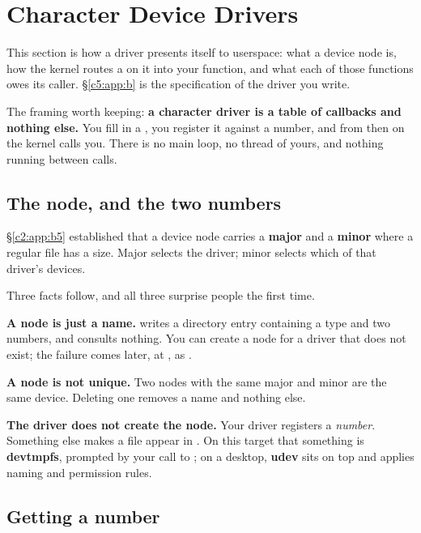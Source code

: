 
\section{Character Device Drivers}
\label{c5:app:a}

This section is how a driver presents itself to userspace: what a device node is, how the kernel
routes a  on it into your function, and what each of those functions owes its caller.
\S\ref{c5:app:b} is the specification of the driver you write.

The framing worth keeping: \textbf{a character driver is a table of callbacks and nothing else.} You
fill in a , you register it against a number, and from then on the
kernel calls you. There is no main loop, no thread of yours, and nothing running between calls.

\subsection{The node, and the two numbers}
\label{c5:app:a1}

\S\ref{c2:app:b5} established that a device node carries a \textbf{major} and a \textbf{minor} where
a regular file has a size. Major selects the driver; minor selects which of that driver's devices.

Three facts follow, and all three surprise people the first time.

\textbf{A node is just a name.}  writes a directory entry containing a type and two
numbers, and consults nothing. You can create a node for a driver that does not exist; the failure
comes later, at , as .

\textbf{A node is not unique.} Two nodes with the same major and minor are the same device. Deleting
one removes a name and nothing else.

\textbf{The driver does not create the node.} Your driver registers a \emph{number}. Something else
makes a file appear in . On this target that something is \textbf{devtmpfs}, prompted by
your call to ; on a desktop, \textbf{udev} sits on top and applies naming and
permission rules.

\subsection{Getting a number}
\label{c5:app:a2}

